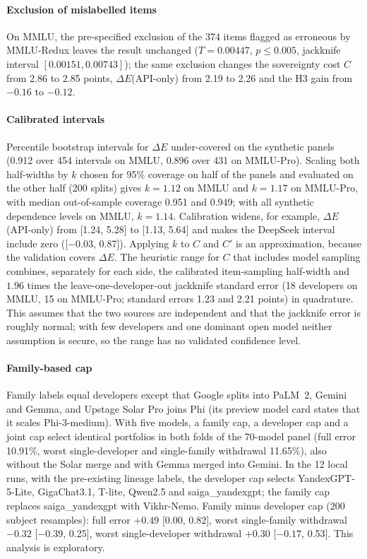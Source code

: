 \documentclass[preprint,12pt,authoryear]{elsarticle}
\newcommand{\dE}{\Delta E}
\begin{document}
\paragraph{Exclusion of mislabelled items} On MMLU, the pre-specified exclusion of the 374 items flagged as erroneous by MMLU-Redux \citep{gema2025mmlu} leaves the result unchanged ($T=0.00447$, $p\le0.005$, jackknife interval $[0.00151, 0.00743]$); the same exclusion changes the sovereignty cost $C$ from 2.86 to 2.85 points, $\dE$(API-only) from 2.19 to 2.26 and the H3 gain from $-0.16$ to $-0.12$.

\paragraph{Calibrated intervals} Percentile bootstrap intervals for $\dE$ under-covered on the synthetic panels (0.912 over 454 intervals on MMLU, 0.896 over 431 on MMLU-Pro). Scaling both half-widths by $k$ chosen for 95\% coverage on half of the panels and evaluated on the other half (200 splits) gives $k=1.12$ on MMLU and $k=1.17$ on MMLU-Pro, with median out-of-sample coverage 0.951 and 0.949; with all synthetic dependence levels on MMLU, $k=1.14$. Calibration widens, for example, $\dE$(API-only) from [1.24, 5.28] to [1.13, 5.64] and makes the DeepSeek interval include zero ([$-0.03$, 0.87]). Applying $k$ to $C$ and $C'$ is an approximation, because the validation covers $\dE$. The heuristic range for $C$ that includes model sampling combines, separately for each side, the calibrated item-sampling half-width and $1.96$ times the leave-one-developer-out jackknife standard error (18 developers on MMLU, 15 on MMLU-Pro; standard errors 1.23 and 2.21 points) in quadrature. This assumes that the two sources are independent and that the jackknife error is roughly normal; with few developers and one dominant open model neither assumption is secure, so the range has no validated confidence level.

\paragraph{Family-based cap} Family labels equal developers except that Google splits into PaLM~2, Gemini and Gemma, and Upstage Solar Pro joins Phi (its preview model card states that it scales Phi-3-medium). With five models, a family cap, a developer cap and a joint cap select identical portfolios in both folds of the 70-model panel (full error 10.91\%, worst single-developer and single-family withdrawal 11.65\%), also without the Solar merge and with Gemma merged into Gemini. In the 12 local runs, with the pre-existing lineage labels, the developer cap selects YandexGPT-5-Lite, GigaChat3.1, T-lite, Qwen2.5 and saiga\_yandexgpt; the family cap replaces saiga\_yandexgpt with Vikhr-Nemo. Family minus developer cap (200 subject resamples): full error $+0.49$ [0.00, 0.82], worst single-family withdrawal $-0.32$ [$-0.39$, 0.25], worst single-developer withdrawal $+0.30$ [$-0.17$, 0.53]. This analysis is exploratory.
\end{document}
